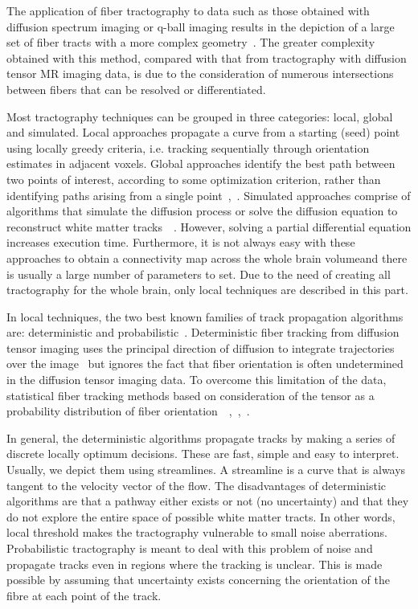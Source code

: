The application of fiber tractography to data such as those obtained with diffusion spectrum imaging or q-ball imaging results in the depiction of a large set of fiber tracts with a more complex geometry~\cite{hagmann2004diffusion}. The greater complexity obtained with this method, compared with that from tractography with diffusion tensor MR imaging data, is due to the consideration of numerous intersections between fibers that can be resolved or differentiated. 

Most tractography techniques can be grouped in three categories: local, global and simulated. Local approaches propagate a curve from a starting (seed) point using locally greedy criteria, i.e. tracking sequentially through orientation estimates in adjacent voxels. Global approaches identify the best path between two points of interest, according to some optimization criterion, rather than identifying paths arising from a single point~\cite{bihan2011MRI},~\cite{jbabdi2007bayesian}. Simulated approaches comprise of algorithms that simulate the diffusion process or solve the diffusion equation to reconstruct white matter tracks~\cite{hageman2006diffusion}~\cite{kang2005fiber}. However, solving a partial differential equation increases execution time. Furthermore, it is not always easy with these approaches to obtain a connectivity map across the whole brain volumeand there is usually a large number of parameters to set. Due to the need of creating all tractography for the whole brain, only local techniques are described in this part.

In local techniques, the two best known families of track propagation algorithms are: deterministic and probabilistic~\cite{descoteaux2009deterministic}. Deterministic fiber tracking from diffusion tensor imaging uses the principal direction of diffusion to integrate trajectories over the image~\cite{mori2002fiber} but ignores the fact that fiber orientation is often undetermined in the diffusion tensor imaging data. To overcome this limitation of the data, statistical fiber tracking methods based on consideration of the tensor as a probability distribution of fiber orientation~\cite{behrens2007probabilistic}~\cite{hagmann2003dti},~\cite{parker2003framework},~\cite{behrens2003characterization}.

In general, the deterministic algorithms propagate tracks by making a series of discrete locally optimum decisions. These are fast, simple and easy to interpret. Usually, we depict them using streamlines. A streamline is a curve that is always tangent to the velocity vector of the flow. The disadvantages of deterministic algorithms are that a pathway either exists or not (no uncertainty) and that they do not explore the entire space of possible white matter tracts. In other words, local threshold makes the tractography vulnerable to small noise aberrations. Probabilistic tractography is meant to deal with this problem of noise and propagate tracks even in regions where the tracking is unclear. This is made possible by assuming that uncertainty exists concerning the orientation of the fibre at each point of the track.

